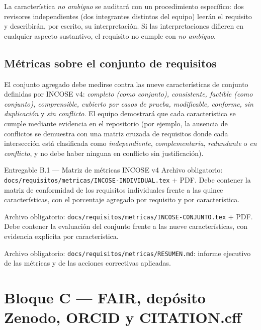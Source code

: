 \documentclass[11pt,a4paper]{article}
\begin{document}
La caracter\'istica \emph{no ambiguo} se auditar\'a con un procedimiento espec\'ifico: dos revisores independientes (dos integrantes distintos del equipo) leer\'an el requisito y describir\'an, por escrito, su interpretaci\'on. Si las interpretaciones difieren en cualquier aspecto sustantivo, el requisito no cumple con \emph{no ambiguo}.

\subsection{M\'etricas sobre el conjunto de requisitos}

El conjunto agregado debe medirse contra las nueve caracter\'isticas de conjunto definidas por INCOSE v4: \emph{completo (como conjunto), consistente, factible (como conjunto), comprensible, cubierto por casos de prueba, modificable, conforme, sin duplicaci\'on} y \emph{sin conflicto}. El equipo demostrar\'a que cada caracter\'istica se cumple mediante evidencia en el repositorio (por ejemplo, la ausencia de conflictos se demuestra con una matriz cruzada de requisitos donde cada intersecci\'on est\'a clasificada como \emph{independiente}, \emph{complementaria}, \emph{redundante} o \emph{en conflicto}, y no debe haber ninguna en conflicto sin justificaci\'on).

\begin{cajaentregable}{Entregable B.1 --- Matriz de m\'etricas INCOSE v4}
Archivo obligatorio: \texttt{docs/requisitos/metricas/INCOSE-INDIVIDUAL.tex} + PDF. Debe contener la matriz de conformidad de los requisitos individuales frente a las quince caracter\'isticas, con el porcentaje agregado por requisito y por caracter\'istica.

Archivo obligatorio: \texttt{docs/requisitos/metricas/INCOSE-CONJUNTO.tex} + PDF. Debe contener la evaluaci\'on del conjunto frente a las nueve caracter\'isticas, con evidencia expl\'icita por caracter\'istica.

Archivo obligatorio: \texttt{docs/requisitos/metricas/RESUMEN.md}: informe ejecutivo de las m\'etricas y de las acciones correctivas aplicadas.
\end{cajaentregable}

\section{Bloque C --- FAIR, dep\'osito Zenodo, ORCID y CITATION.cff}
\end{document}
